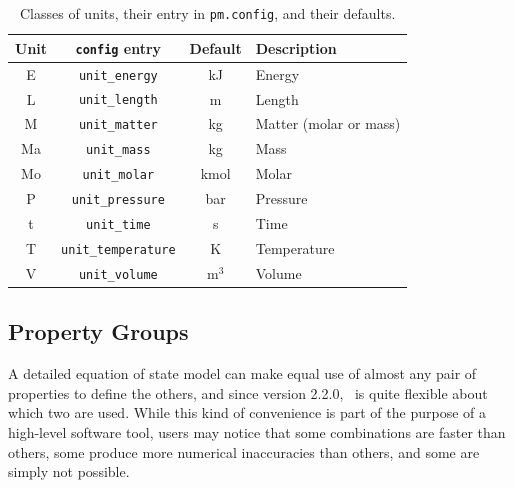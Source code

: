 \begin{table}
\centering
\caption{Classes of units, their entry in \texttt{pm.config}, and their defaults.}\label{tab:units}
\begin{tabular}{|cccl|}
\hline
Unit & \verb|config| entry & Default & Description\\
\hline
E & \verb|unit_energy| & kJ & Energy\\
L & \verb|unit_length| & m & Length\\
M & \verb|unit_matter| & kg & Matter (molar or mass)\\
Ma & \verb|unit_mass| & kg & Mass\\
Mo & \verb|unit_molar| & kmol & Molar\\
P & \verb|unit_pressure| & bar & Pressure\\
t & \verb|unit_time| & s & Time\\
T & \verb|unit_temperature| & K & Temperature\\
V & \verb|unit_volume| & m$^3$ & Volume\\
\hline
\end{tabular}
\end{table}

\subsection{Property Groups}

A detailed equation of state model can make equal use of almost any pair of properties to define the others, and since version 2.2.0, \PM\ is quite flexible about which two are used.  While this kind of convenience is part of the purpose of a high-level software tool, users may notice that some combinations are faster than others, some produce more numerical inaccuracies than others, and some are simply not possible.


